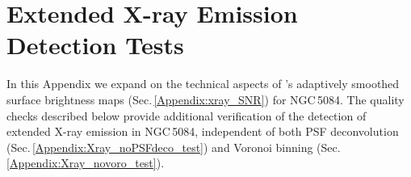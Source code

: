 \documentclass[modern]{CORE-AAS/aastex631}
\begin{document}
{}%
\appendix
{}
\section{Extended X-ray Emission Detection Tests}
\label{Appendix:xray_tests}
In this Appendix we expand on the technical aspects of \SAUNAS's \citep{borlaff+2024apj967_169} adaptively smoothed surface brightness maps (Sec.\,\ref{Appendix:xray_SNR}) for NGC\,5084. The quality checks described below provide additional verification of the detection of  extended X-ray emission in NGC\,5084, independent of both PSF deconvolution (Sec.\,\ref{Appendix:Xray_noPSFdeco_test}) and Voronoi binning (Sec.\,\ref{Appendix:Xray_novoro_test}).
\end{document}
